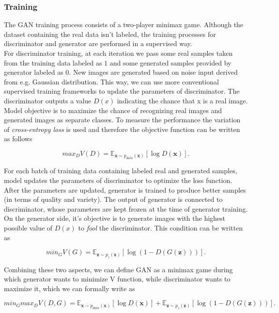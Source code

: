 \documentclass[11pt,a4paper,openany]{book}
\begin{document}
\subsubsection{Training}
\noindent The GAN training process consists of a two-player minimax game. Although the dataset containing the real data isn’t labeled, the training processes for discriminator and generator are performed in a supervised way.  \\
\noindent For discriminator training, at each iteration we pass some real samples taken from the training data labeled as $1$ and some generated samples provided by generator labeled as $0$. New images are generated based on noise input derived from e.g. Gaussian distribution. This way, we can use more conventional supervised training frameworks to update the parameters of discriminator. The discriminator outputs a value $D(x)$ indicating the chance that x is a real image. Model objective is to maximize the chance of recognizing real images and generated images as separate classes. To measure the performance the variation of \textit{cross-entropy loss} is used and therefore the objective function can be written as follows

\begin{equation}
max_{D} V(D) = \mathbb{E}_{\textbf{x} \sim p_{data}(\textbf{x})} [\log D(\textbf{x})].
\end{equation}

\noindent For each batch of training data containing labeled real and generated samples, model updates the parameters of discriminator to optimize the loss function. After the parameters are updated, generator is trained to produce better samples (in terms of quality and variety). The output of generator is connected to discriminator, whose parameters are kept frozen at the time of generator training. On the generator side, it's objective is to generate images with the highest possible value of $D(x)$ to \textit{fool} the discriminator. This condition can be written as

\begin{equation}
min_{G} V(G) = \mathbb{E}_{\textbf{z} \sim p_{z}(\textbf{z})} [\log(1-D(G(\textbf{z})))].
\end{equation}

\noindent Combining these two aspects, we can define GAN as a minimax game during which generator wants to minimize V function, while discriminator wants to maximize it, which we can formally write as

\begin{equation}
min_{G} max_{D} V(D, G) =  \mathbb{E}_{\textbf{x} \sim p_{data}(\textbf{x})} [\log D(\textbf{x})] + \mathbb{E}_{\textbf{z} \sim p_{z}(\textbf{z})} [\log(1-D(G(\textbf{z})))].
\end{equation}
\end{document}
